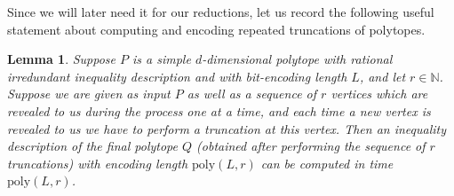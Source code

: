 \documentclass[centering,11pt,reqno]{amsart}
\newtheorem{lem}[theorem]{Lemma}
\theoremstyle{definition}
\begin{document}
Since we will later need it for our reductions, let us record the following useful statement about computing and encoding repeated truncations of polytopes.
\begin{lem}\label{lem:complexity}
Suppose $P$ is a simple $d$-dimensional polytope with rational irredundant inequality description and with bit-encoding length $L$, and let $r\in \mathbb{N}$. Suppose we are given as input $P$ as well as a sequence of $r$ vertices which are  revealed to us during the process one at a time, and each time a new vertex is revealed to us we have to perform a truncation at this vertex. Then an inequality description of the final polytope $Q$ (obtained after performing the sequence of $r$ truncations) with encoding length $\mathrm{poly}(L,r)$ can be computed in time $\mathrm{poly}(L,r)$.
\end{lem}
\end{document}
